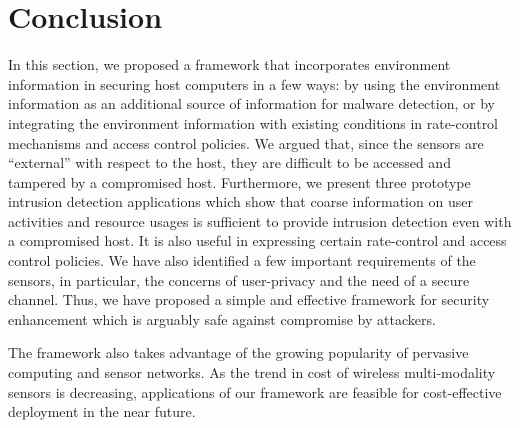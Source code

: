 \section{Conclusion}
\label{sec:sensor-conclusion}

In this section, we proposed a framework that incorporates environment
information in securing host computers in a few ways: by using the
environment information as an additional source of information for
malware detection, or by integrating the environment information
with existing conditions in rate-control mechanisms and access
control policies.   We argued that, since the sensors are
``external'' with respect to the host, they are difficult to be
accessed and tampered by a compromised host. Furthermore, 
we present three prototype intrusion detection applications which show that
coarse information on user activities and resource usages is
sufficient to provide intrusion detection even with a compromised host.
It is also useful in expressing certain rate-control and access control
policies. We have also identified a few important requirements of
the sensors, in particular, the concerns of user-privacy and the
need of a secure channel. Thus, we have proposed a simple and
effective framework for security enhancement which is arguably safe
against compromise by attackers.

The framework also takes advantage of the growing popularity of
pervasive computing and sensor networks.  As the trend in cost of wireless
multi-modality sensors is decreasing, applications of our framework are
feasible for cost-effective deployment in the near future.
